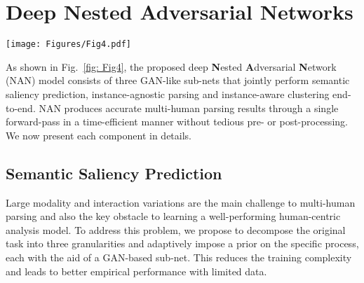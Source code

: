 \documentclass[10pt,twocolumn,letterpaper]{article}
\theoremstyle{definition}
\theoremstyle{remark}
\begin{document}
\section{Deep Nested Adversarial Networks}

\begin{figure*}[t]
	\begin{center}
		\texttt{[image: Figures/Fig4.pdf]}
	\end{center}
	\vspace{-4mm}
	\small
	\caption{\small Deep Nested Adversarial Networks (NAN) for multi-human parsing. NAN consists of three GAN-like sub-nets, respectively performing semantic saliency prediction, instance-agnostic parsing and instance-aware clustering. Each sub-task is simpler than the original multi-human parsing task, and is more easily addressed by the corresponding sub-net. The sub-nets depend on each other, forming a causal nest by dynamically boosting each other via an adversarial strategy. Such a structure enables effortless gradient \textbf{}Back\textbf{P}ropagation (BP) of NAN such that it can be trained in a holistic, end-to-end way. NAN produces accurate multi-human parsing results through a single forward-pass in a time-efficient manner without tedious pre- or post-processing. Best viewed in color.}
	\label{fig: Fig4}
\end{figure*}

As shown in Fig.~\ref{fig: Fig4}, the proposed deep \textbf{N}ested \textbf{A}dversarial \textbf{N}etwork (NAN) model consists of three GAN-like sub-nets that  jointly perform semantic saliency prediction, instance-agnostic parsing and instance-aware clustering end-to-end. NAN produces accurate multi-human parsing results through a single forward-pass in a time-efficient manner without tedious pre- or post-processing. We now present each component in details.

\subsection{Semantic Saliency Prediction}

Large modality and interaction variations are the main challenge to multi-human parsing and also the key obstacle to learning a well-performing human-centric analysis model. To address this problem, we propose to decompose the original task into three granularities and adaptively impose a prior on the specific process, each with the aid of a GAN-based sub-net. This reduces the training complexity and leads to better empirical performance with limited data. 
\end{document}
